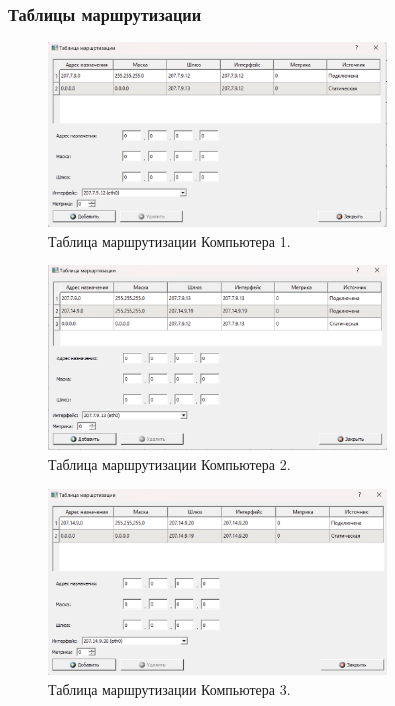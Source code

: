 \documentclass[12pt,onecolumn]{article}
\begin{document}
\begin{itemize}
\subsubsection{Таблицы маршрутизации}
\begin{figure}[H]
  \centering
  \includegraphics[width=0.8\textwidth]{image/routing-table-1.png}
  \caption{Таблица маршрутизации Компьютера 1.}
\end{figure}
\begin{figure}[H]
  \centering
  \includegraphics[width=0.8\textwidth]{image/routing-table-2-2.png}
  \caption{Таблица маршрутизации Компьютера 2.}
\end{figure}
\begin{figure}[H]
  \centering
  \includegraphics[width=0.8\textwidth]{image/routing-table-3.png}
  \caption{Таблица маршрутизации Компьютера 3.}
\end{figure}


\end{itemize}
\end{document}
